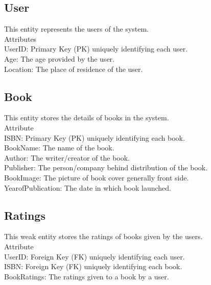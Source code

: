 \subsection*{User}
This entity represents the users of the system.\\
Attributes\\ UserID: Primary Key (PK) uniquely identifying each user.\\
Age: The age provided by the user.\\
Location: The place of residence of the user.

\subsection*{Book}
This entity stores the details of books in the system.\\
Attribute\\ ISBN: Primary Key (PK) uniquely identifying each book.\\
BookName: The name of the book.\\
Author: The writer/creator of the book.\\
Publisher: The person/company behind distribution of the book.\\
BookImage: The picture of book cover generally front side.\\
YearofPublication: The date in which book launched.

\subsection*{Ratings}
This weak entity stores the ratings of books given by the users.\\
Attribute\\ UserID: Foreign Key (FK) uniquely identifying each user.\\
ISBN: Foreign Key (FK) uniquely identifying each book.\\
BookRatings: The ratings given to a book by a user.\\

